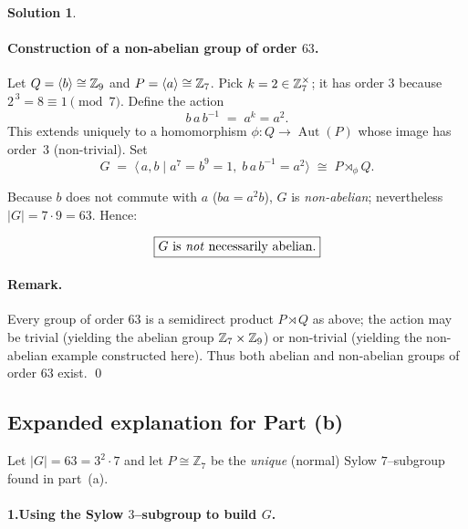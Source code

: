 \documentclass[12pt]{article}
\theoremstyle{definition} %
\newtheorem{solution}{Solution}
\theoremstyle{plain} %
\begin{document}
\begin{solution}
            \paragraph{Construction of a non-abelian group of order $63$.}
            Let $Q=\langle b\rangle\cong\Bbb Z_{9}$ and
            $P=\langle a\rangle\cong\Bbb Z_{7}$.
            Pick $k=2\in\Bbb Z_{7}^{\times}$; it has order $3$ because
            $2^{\,3}=8\equiv 1\pmod 7$.
            Define the action
            \[
                    b\,a\,b^{-1} \;=\; a^{k}=a^{2}.
            \]
            This extends uniquely to a homomorphism
            $\phi:Q\to\operatorname{Aut}(P)$ whose image has order~$3$ (non-trivial).
            Set
            \[
                    G \;=\; \langle\,a,b \mid
                            a^{7}=b^{9}=1,\;
                            b\,a\,b^{-1}=a^{2}\rangle
                    \;\cong\;
                    P\rtimes_{\phi} Q.
            \]
            
            Because $b$ does not commute with $a$ ($ba=a^{2}b$), $G$ is
            \emph{non-abelian}; nevertheless $|G|=7\cdot 9 = 63$.
            Hence:
            
            \[
               \boxed{\text{$G$ is \emph{not} necessarily abelian.}}
            \]
            
            \paragraph{Remark.}
            Every group of order $63$ is a semidirect product
            $P\rtimes Q$ as above; the action may be trivial (yielding the abelian
            group $\Bbb Z_{7}\times\Bbb Z_{9}$) or non-trivial (yielding the
            non-abelian example constructed here).  Thus both abelian and
            non-abelian groups of order $63$ exist.
            \qed
            \end{solution}
\subsection*{Expanded explanation for Part (b)}

Let $|G|=63=3^{2}\!\cdot 7$ and let $P\cong\mathbb{Z}_{7}$ be the \emph{unique}
(normal) Sylow $7$–subgroup found in part~(a).

\bigskip
\paragraph{\textbf{1.\;Using the Sylow $3$–subgroup to build $G$.}}
\end{document}
